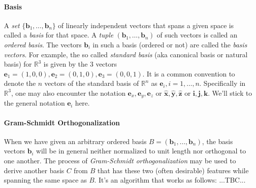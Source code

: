 \paragraph{Basis}
A \emph{set} $\{\mathbf{b}_1, \ldots, \mathbf{b}_n \}$ of linearly independent vectors that spans a given space is called a \emph{basis} for that space. A \emph{tuple} $(\mathbf{b}_1, \ldots, \mathbf{b}_n)$ of such vectors is called an \emph{ordered basis}. The vectors $\mathbf{b}_i$ in such a basis (ordered or not) are called the \emph{basis vectors}. For example, the so called \emph{standard basis} (aka canonical basis or natural basis) for $\mathbb{R}^3$ is given by the 3 vectors $\mathbf{e}_1 = (1,0,0), \mathbf{e}_2 = (0,1,0), \mathbf{e}_3 = (0,0,1)$. It is a common convention to denote the $n$ vectors of the standard basis of $\mathbb{R}^n$ as $\mathbf{e}_i, i = 1,\ldots,n$. Specifically in $\mathbb{R}^3$, one may also encounter the notation $\mathbf{e}_x, \mathbf{e}_y, \mathbf{e}_z$ or $\hat{\mathbf{x}}, \hat{\mathbf{y}}, \hat{\mathbf{z}}$ or  $\mathbf{i}, \mathbf{j}, \mathbf{k}$. We'll stick to the general notation $\mathbf{e}_i$ here.


\paragraph{Gram-Schmidt Orthogonalization}
When we have given an arbitrary ordered basis $B = (\mathbf{b}_1, \ldots, \mathbf{b}_n)$, the basis vectors $\mathbf{b}_i$ will be in general neither normalized to unit length nor orthogonal to one another. The process of \emph{Gram-Schmidt orthogonalization} may be used to derive another basis $C$ from $B$ that has these two (often desirable) features while spanning the same space as $B$. It's an algorithm that works as follows: ...TBC...

